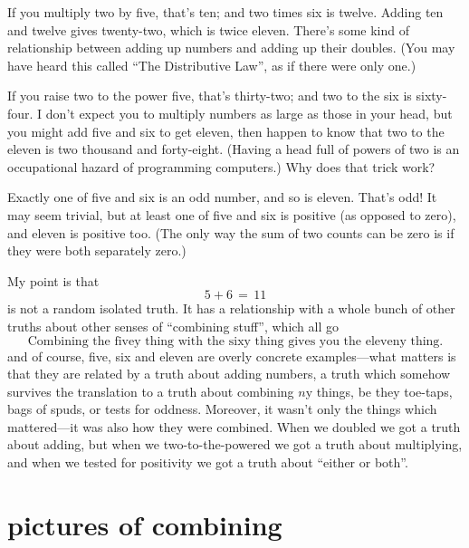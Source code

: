 \documentclass{book}
\begin{document}
If you multiply two by five, that's ten; and two times six is twelve. Adding ten and twelve gives twenty-two, which is twice eleven. There's some kind of relationship between adding up numbers and adding up their doubles. (You may have heard this called ``The Distributive Law'', as if there were only one.)

If you raise two to the power five, that's thirty-two; and two to the six is sixty-four. I don't expect you to multiply numbers as large as those in your head, but you might add five and six to get eleven, then happen to know that two to the eleven is two thousand and forty-eight. (Having a head full of powers of two is an occupational hazard of programming computers.) Why does that trick work?

Exactly one of five and six is an odd number, and so is eleven. That's odd! It may seem trivial, but at least one of five and six is positive (as opposed to zero), and eleven is positive too. (The only way the sum of two counts can be zero is if they were both separately zero.)

My point is that
\[
5 + 6 \,=\, 11
\]
is not a random isolated truth. It has a relationship with a whole bunch of other truths about other senses of ``combining stuff'', which all go
\[
\mbox{Combining the fivey thing with the sixy thing gives you the eleveny thing.}
\]
and of course, five, six and eleven are overly concrete examples---what matters is that they are related by a truth about adding numbers, a truth which somehow survives the translation to a truth about combining $n$y things, be they toe-taps, bags of spuds, or tests for oddness. Moreover, it wasn't only the things which mattered---it was also how they were combined. When we doubled we got a truth about adding, but when we two-to-the-powered we got a truth about multiplying, and when we tested for positivity we got a truth about ``either or both''.


\section{pictures of combining}

\newcommand{\wye}[3]{\begin{array}[b]{@{}c@{}}\underbrace{\!\!#1\;\;#2\!\!}\\ #3\end{array}}
\newcommand{\wir}[2]{\begin{array}[b]{@{}c@{}}#1\\ \mid\\ #2\end{array}}
\newcommand{\wid}[1]{\wir{#1}{#1}}
\newcommand{\naw}[1]{\begin{array}[b]{@{}c@{}}\bullet \vspace*{-0.13in}\\ \mid \\ #1\end{array}}
\end{document}
